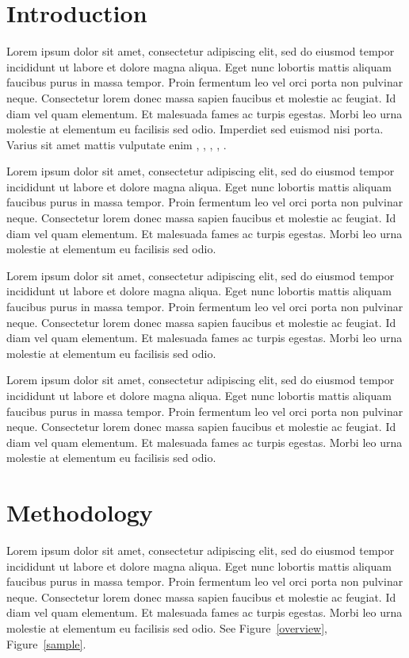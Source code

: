 \documentclass{article}
\begin{document}
\section{Introduction}

Lorem ipsum dolor sit amet, consectetur adipiscing elit, sed do eiusmod tempor incididunt ut labore et dolore magna aliqua. Eget nunc lobortis mattis aliquam faucibus purus in massa tempor. Proin fermentum leo vel orci porta non pulvinar neque. Consectetur lorem donec massa sapien faucibus et molestie ac feugiat. Id diam vel quam elementum. Et malesuada fames ac turpis egestas. Morbi leo urna molestie at elementum eu facilisis sed odio. Imperdiet sed euismod nisi porta. Varius sit amet mattis vulputate enim \cite{1_}, \cite{2_}, \cite{3_}, \cite{4_}, \cite{5_}.

Lorem ipsum dolor sit amet, consectetur adipiscing elit, sed do eiusmod tempor incididunt ut labore et dolore magna aliqua. Eget nunc lobortis mattis aliquam faucibus purus in massa tempor. Proin fermentum leo vel orci porta non pulvinar neque. Consectetur lorem donec massa sapien faucibus et molestie ac feugiat. Id diam vel quam elementum. Et malesuada fames ac turpis egestas. Morbi leo urna molestie at elementum eu facilisis sed odio.

Lorem ipsum dolor sit amet, consectetur adipiscing elit, sed do eiusmod tempor incididunt ut labore et dolore magna aliqua. Eget nunc lobortis mattis aliquam faucibus purus in massa tempor. Proin fermentum leo vel orci porta non pulvinar neque. Consectetur lorem donec massa sapien faucibus et molestie ac feugiat. Id diam vel quam elementum. Et malesuada fames ac turpis egestas. Morbi leo urna molestie at elementum eu facilisis sed odio.

Lorem ipsum dolor sit amet, consectetur adipiscing elit, sed do eiusmod tempor incididunt ut labore et dolore magna aliqua. Eget nunc lobortis mattis aliquam faucibus purus in massa tempor. Proin fermentum leo vel orci porta non pulvinar neque. Consectetur lorem donec massa sapien faucibus et molestie ac feugiat. Id diam vel quam elementum. Et malesuada fames ac turpis egestas. Morbi leo urna molestie at elementum eu facilisis sed odio.



\section{Methodology}

Lorem ipsum dolor sit amet, consectetur adipiscing elit, sed do eiusmod tempor incididunt ut labore et dolore magna aliqua. Eget nunc lobortis mattis aliquam faucibus purus in massa tempor. Proin fermentum leo vel orci porta non pulvinar neque. Consectetur lorem donec massa sapien faucibus et molestie ac feugiat. Id diam vel quam elementum. Et malesuada fames ac turpis egestas. Morbi leo urna molestie at elementum eu facilisis sed odio. See Figure~\ref{overview}, Figure~\ref{sample}.
\end{document}
